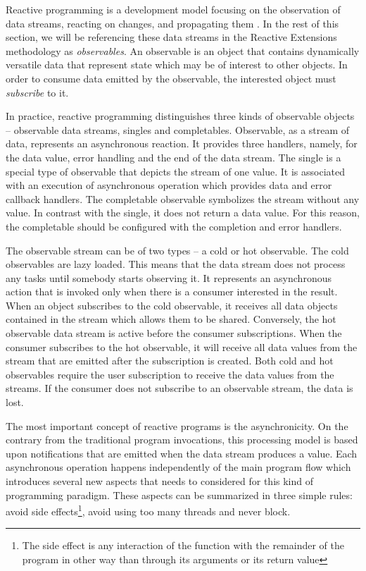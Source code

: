 \documentclass[oneside,
  digital, %
  table,   %
  lof,     %
  lot,     %
]{fithesis3}
\begin{document}
Reactive programming is a development model focusing on the observation of data streams, reacting on changes, and propagating them \cite{building_reactive_ms_in_java}. In the rest of this section, we will be referencing these data streams in the Reactive Extensions methodology as \textit{observables}. An observable is an object that contains dynamically versatile data that represent state which may be of interest to other objects. In order to consume data emitted by the observable, the interested object must \textit{subscribe} to it.

In practice, reactive programming distinguishes three kinds of observable objects -- observable data streams, singles and completables. Observable, as a stream of data, represents an asynchronous reaction. It provides three handlers, namely, for the data value, error handling and the end of the data stream. The single is a special type of observable that depicts the stream of one value. It is associated with an execution of asynchronous operation which provides data and error callback handlers. The completable observable symbolizes the stream without any value. In contrast with the single, it does not return a data value. For this reason, the completable should be configured with the completion and error handlers.

The observable stream can be of two types -- a cold or hot observable. The cold observables are lazy loaded. This means that the data stream does not process any tasks until somebody starts observing it. It represents an asynchronous action that is invoked only when there is a consumer interested in the result. When an object subscribes to the cold observable, it receives all data objects contained in the stream which allows them to be shared. Conversely, the hot observable data stream is active before the consumer subscriptions. When the consumer subscribes to the hot observable, it will receive all data values from the stream that are emitted after the subscription is created. Both cold and hot observables require the user subscription to receive the data values from the streams. If the consumer does not subscribe to an observable stream, the data is lost.

The most important concept of reactive programs is the asynchronicity. On the contrary from the traditional program invocations, this processing model is based upon notifications that are emitted when the data stream produces a value. Each asynchronous operation happens independently of the main program flow which introduces several new aspects that needs to considered for this kind of programming paradigm. These aspects can be summarized in three simple rules: avoid side effects\footnote{The side effect is any interaction of the function with the remainder of the program in other way than through its arguments or its return value}, avoid using too many threads and never block.
\end{document}
